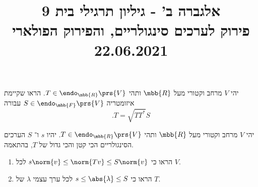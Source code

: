 \documentclass[a4paper,10pt,twoside,openany]{article}
\title{
אלגברה ב' - גיליון תרגילי בית 9 \\
פירוק לערכים סינגולריים, והפירוק הפולארי
\\
\small{22.06.2021}
}
\date{}
\begin{document}
\maketitle

\begin{exercise}
יהי
$V$
מרחב וקטורי מעל
$\mbb{R}$
ותהי
$T \in \endo_{\mbb{R}}\prs{V}$.
הראו שקיימת איזומטריה
$S \in \endo_{\mbb{F}}\prs{V}$
עבורה
\[\text{.} T = \sqrt{T T^*} S\]
\end{exercise}

\begin{exercise}
יהי
$V$
מרחב וקטורי מעל
$\mbb{R}$
ותהי
$T \in \endo_{\mbb{R}}\prs{V}$.
יהיו
$s$
ו־%
$S$
הערכים הסינגולריים הכי קטן והכי גדול של
$T$,
בהתאמה.
\begin{enumerate}
\item הראו כי
$s \norm{v} \leq \norm{Tv} \leq S\norm{v}$
לכל
$V$.
\item הראו כי
$s \leq \abs{\lambda} \leq S$
לכל ערך עצמי
$\lambda$
של
$T$.
\end{enumerate}
\end{exercise}
\end{document}
